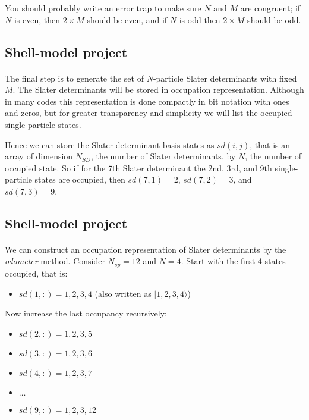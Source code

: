 \documentclass[%
oneside,                 %
final,                   %
10pt]{article}
\begin{document}
You should probably write an error trap to make sure $N$ and $M$ are congruent; if $N$ is even, then 
$2 \times M$ should be even, and if $N$ is odd then $2\times M$ should be odd.



\subsection*{Shell-model project}

\paragraph{}
The final step is to generate the set of $N$-particle Slater determinants with fixed $M$. 
The Slater determinants will be stored in occupation representation.  Although in many codes
this representation is done compactly in bit notation with ones and zeros, but for 
greater transparency and simplicity we will list the occupied single particle states.

 Hence we can 
store the Slater determinant basis states as $sd(i,j)$, that is an 
array of dimension $N_{SD}$, the number of Slater determinants, by $N$, the number of occupied 
state. So if for the 7th Slater determinant the 2nd, 3rd, and 9th single-particle states are occupied, 
then $sd(7,1) = 2$, $sd(7,2) = 3$, and $sd(7,3) = 9$.



\subsection*{Shell-model project}

\paragraph{}

We can construct an occupation representation of Slater determinants by the \emph{odometer}
method.  Consider $N_{sp} = 12$ and $N=4$. 
Start with the first 4 states occupied, that is:

\begin{itemize}
\item $sd(1,:)= 1,2,3,4$ (also written as $|1,2,3,4 \rangle$)
\end{itemize}

\noindent
Now increase the last occupancy recursively:
\begin{itemize}
\item $sd(2,:)= 1,2,3,5$

\item $sd(3,:)= 1,2,3,6$

\item $sd(4,:)= 1,2,3,7$

\item $\ldots$

\item $sd(9,:)= 1,2,3,12$
\end{itemize}
\end{document}
